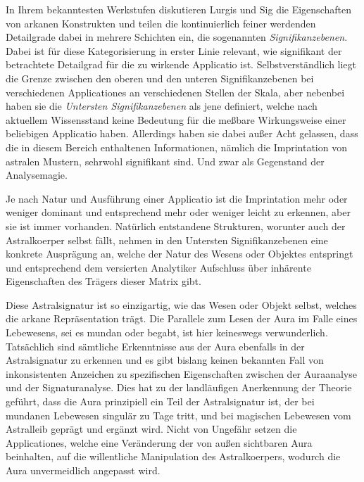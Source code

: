 \documentclass[a5paper,8pt]{book}
\begin{document}
\begin{multicols}{2}
In Ihrem bekanntesten Werkstufen diskutieren Lurgis und Sig die Eigenschaften von arkanen Konstrukten und
teilen die kontinuierlich feiner werdenden Detailgrade dabei in mehrere Schichten ein, die sogenannten
\textit{Signifikanzebenen}. Dabei ist für diese Kategorisierung in erster Linie relevant, wie signifikant der betrachtete
Detailgrad für die zu wirkende Applicatio ist. Selbstverständlich liegt die Grenze zwischen den
oberen und den unteren Signifikanzebenen bei verschiedenen Applicationes an verschiedenen Stellen der Skala, aber
nebenbei haben sie die \textit{Untersten Signifikanzebenen} als jene definiert, welche nach aktuellem Wissensstand keine Bedeutung für
die meßbare Wirkungsweise einer beliebigen Applicatio haben. Allerdings haben sie dabei außer Acht gelassen, dass die in
diesem Bereich enthaltenen Informationen, nämlich die Imprintation von astralen Mustern, sehrwohl signifikant sind.
Und zwar als Gegenstand der Analysemagie.

Je nach Natur und Ausführung einer Applicatio ist die Imprintation mehr oder weniger dominant und entsprechend mehr oder
weniger leicht zu erkennen, aber sie ist immer vorhanden. Natürlich entstandene Strukturen, worunter auch der
Astralkoerper selbst fällt, nehmen in den Untersten Signifikanzebenen eine konkrete Ausprägung an, welche der Natur des
Wesens oder Objektes entspringt und entsprechend dem versierten Analytiker Aufschluss über inhärente Eigenschaften des
Trägers dieser Matrix gibt. 

Diese Astralsignatur ist so einzigartig, wie das Wesen oder Objekt selbst, welches die
arkane Repräsentation trägt. Die Parallele zum Lesen der Aura im Falle eines Lebewesens, sei es mundan oder begabt, ist
hier keineswegs verwunderlich. Tatsächlich sind sämtliche Erkenntnisse aus der Aura ebenfalls in der Astralsignatur zu
erkennen und es gibt bislang keinen bekannten Fall von inkonsistenten Anzeichen zu spezifischen Eigenschaften zwischen
der Auraanalyse und der Signaturanalyse. Dies hat zu der landläufigen Anerkennung der Theorie geführt, dass
die Aura prinzipiell ein Teil der Astralsignatur ist, der bei mundanen Lebewesen singulär zu Tage tritt, und bei
magischen Lebewesen vom Astralleib geprägt und ergänzt wird. Nicht von Ungefähr setzen die Applicationes, welche eine
Veränderung der von außen sichtbaren Aura beinhalten, auf die willentliche Manipulation des Astralkoerpers, wodurch die
Aura unvermeidlich angepasst wird.


\end{multicols}
\end{document}
